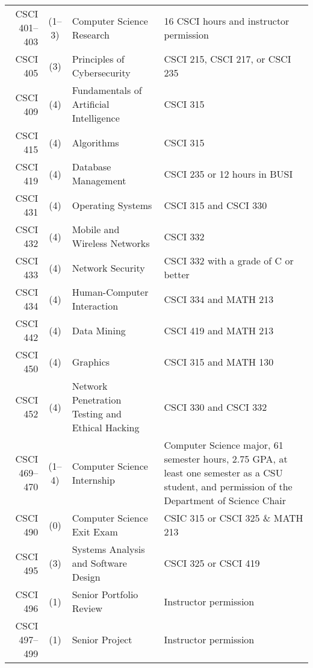 \begin{reqgroup}[left*=1pt,right*=1pt,bottom=0pt]{}
\begin{tabularx}{\textwidth}{ r c l  | X }
	CSCI 401--403 & (1--3) & Computer Science Research                   & 16 CSCI hours and instructor permission \\
	CSCI 405 & (3) & Principles of Cybersecurity                         & CSCI 215, CSCI 217, or CSCI 235 \\
	CSCI 409 & (4) & Fundamentals of Artificial Intelligence             & CSCI 315 \\
	CSCI 415 & (4) & Algorithms                                          & CSCI 315 \\
	CSCI 419 & (4) & Database Management                         & CSCI 235 or 12 hours in BUSI \\
	CSCI 431 & (4) & Operating Systems                         & CSCI 315 and CSCI 330 \\
	CSCI 432 & (4) & Mobile and Wireless Networks                         & CSCI 332 \\
	CSCI 433 & (4) & Network Security                         & CSCI 332 with a grade of C or better \\
	CSCI 434 & (4) & Human-Computer Interaction                         & CSCI 334 and MATH 213 \\
	CSCI 442 & (4) & Data Mining                         & CSCI 419 and MATH 213 \\
	CSCI 450 & (4) & Graphics                         & CSCI 315 and MATH 130 \\
	CSCI 452 & (4) & Network Penetration Testing and Ethical Hacking    & CSCI 330 and CSCI 332 \\
	CSCI 469--470 & (1--4) & Computer Science Internship                  & Computer Science major, 61 semester hours, 2.75 GPA, at least one semester as a CSU student, and permission of the Department of Science Chair \\
	CSCI 490 & (0) & Computer Science Exit Exam                         &  CSIC 315 or CSCI 325 \& MATH 213 \\
	CSCI 495 & (3) & Systems Analysis and Software Design               & CSCI 325 or CSCI 419 \\
	CSCI 496 & (1) & Senior Portfolio Review                         & Instructor permission \\
	CSCI 497--499 & (1) & Senior Project                         & Instructor permission \\
\end{tabularx}
\end{reqgroup}

